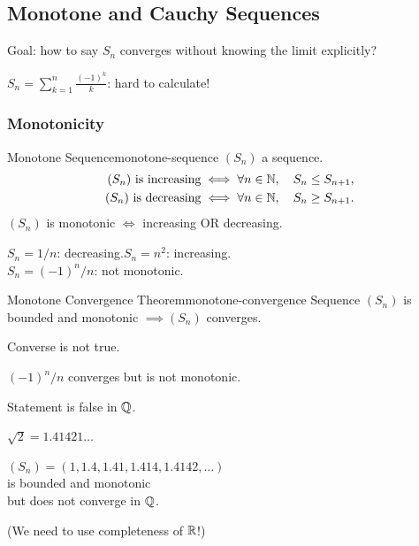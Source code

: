 \subsection{Monotone and Cauchy Sequences}

Goal: how to say $S_n$ converges without knowing the limit explicitly?
\begin{example}
  $\displaystyle S_n=\sum_{k=1}^n\frac{(-1)^k}{k}$: hard to calculate!
\end{example}

\subsubsection{Monotonicity}

\begin{definition}{Monotone Sequence}{monotone-sequence}
  $(S_n)$ a sequence.
  \begin{align*}
    (S_n)\text{ is increasing} & \iff\forall n\in\mathbb{N},\quad S_n\le S_{n+1}, \\
    (S_n)\text{ is decreasing} & \iff\forall n\in\mathbb{N},\quad S_n\ge S_{n+1}.
  \end{align*}
  $(S_n)$ is monotonic $\iff$ increasing OR decreasing.
\end{definition}

\begin{example}
  $S_n=1/n$: decreasing.\qquad $S_n=n^2$: increasing.\\
  $S_n=(-1)^n/n$: not monotonic.
\end{example}

\begin{theorem}{Monotone Convergence Theorem}{monotone-convergence}
  Sequence $(S_n)$ is bounded and monotonic $\implies(S_n)$ converges.
\end{theorem}

\begin{note}
  Converse is not true.
\end{note}
\begin{example}[Counterexample]
  $(-1)^n/n$ converges but is not monotonic.
\end{example}

\begin{note}
  Statement is false in $\mathbb{Q}$.
\end{note}
\begin{example}[Counterexample]
  $\sqrt2=1.41421\ldots$
  \begin{flushleft}
    $(S_n)=(1,1.4,1.41,1.414,1.4142,\ldots)$\\
    is bounded and monotonic\\
    but does not converge in $\mathbb{Q}$.
  \end{flushleft}
\end{example}
(We need to use completeness of $\mathbb{R}$!)

